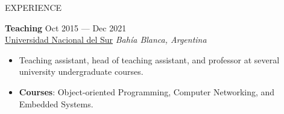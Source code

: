 \documentclass{resume} %
\begin{document}
\begin{rSection}{EXPERIENCE}





\textbf{Teaching} \hfill Oct 2015 --- Dec 2021\\
\underline{Universidad Nacional del Sur} \hfill \textit{Bahía Blanca, Argentina}\\
\vspace{-0.7cm}

\begin{itemize}
    \item Teaching assistant, head of teaching assistant, and professor at several university undergraduate courses.
    \vspace{-0.25cm}
    \item \textbf{Courses}: Object-oriented Programming, Computer Networking, and Embedded Systems. 
\end{itemize}

\end{rSection} 




\end{document}
